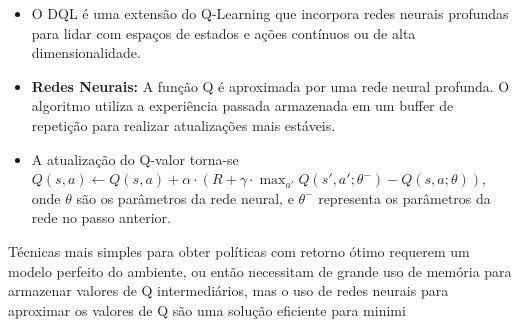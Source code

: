 \begin{itemize}
	\begin{itemize}
		\item O DQL é uma extensão do Q-Learning que incorpora redes neurais profundas para lidar com espaços de estados e ações contínuos ou de alta dimensionalidade.
		\item \textbf{Redes Neurais:} A função Q é aproximada por uma rede neural profunda. O algoritmo utiliza a experiência passada armazenada em um buffer de repetição para realizar atualizações mais estáveis.
		\item A atualização do Q-valor torna-se \(Q(s, a) \leftarrow Q(s, a) + \alpha \cdot (R + \gamma \cdot \max_{a'} Q(s', a'; \theta^-) - Q(s, a; \theta))\), onde \(\theta\) são os parâmetros da rede neural, e \(\theta^-\) representa os parâmetros da rede no passo anterior.
	\end{itemize}
\end{itemize}

Técnicas mais simples para obter políticas com retorno ótimo requerem um modelo perfeito do ambiente, ou então necessitam de grande uso de memória para armazenar valores de Q intermediários, mas o uso de redes neurais para aproximar os valores de Q são uma solução eficiente para minimi

